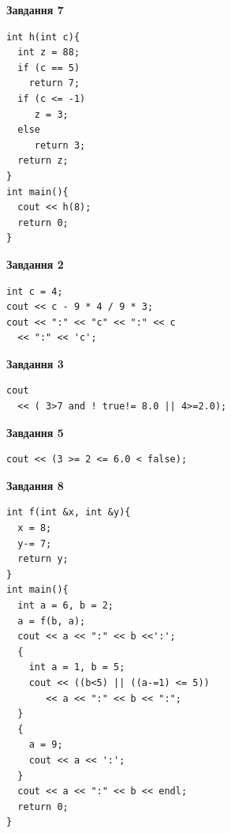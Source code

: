 \documentclass[12pt, ukrainian]{article}
\begin{document}
{\begin {large}
\begin{minipage}[t]{7.0cm}
\begin{center}
\textbf{Завдання 7}
\end{center}
\vspace{-8mm}

\begin{verbatim}
int h(int c){
  int z = 88;
  if (c == 5)
    return 7;
  if (c <= -1)
     z = 3;
  else
     return 3;
  return z;
}
int main(){
  cout << h(8);
  return 0;
}
\end{verbatim}

\end{minipage}
\vline \hspace{1mm}
\begin{minipage}[t]{11.0cm}

\begin{center}
\textbf{Завдання 2}
\end{center}
\vspace{-8mm}

\begin{verbatim}
int c = 4;
cout << c - 9 * 4 / 9 * 3;
cout << ":" << "c" << ":" << c 
  << ":" << 'c';
\end{verbatim}



\begin{center}
\textbf{Завдання 3}
\end{center}
\vspace{-8mm}

\begin{verbatim}
cout 
  << ( 3>7 and ! true!= 8.0 || 4>=2.0);
\end{verbatim}



\begin{center}
\textbf{Завдання 5}
\end{center}
\vspace{-8mm}

\begin{verbatim}
cout << (3 >= 2 <= 6.0 < false);
\end{verbatim}



\begin{center}
\textbf{Завдання 8}
\end{center}
\vspace{-8mm}

\begin{verbatim}
int f(int &x, int &y){
  x = 8;
  y-= 7;
  return y;
}
int main(){
  int a = 6, b = 2;
  a = f(b, a);
  cout << a << ":" << b <<':';
  {
    int a = 1, b = 5;
    cout << ((b<5) || ((a-=1) <= 5))
       << a << ":" << b << ":";
  }
  {
    a = 9;
    cout << a << ':';
  }
  cout << a << ":" << b << endl;
  return 0;
}
\end{verbatim}


\end{minipage}
\end{large}}
\end{document}
